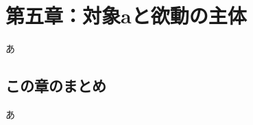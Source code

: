 \section{第五章：対象aと欲動の主体}\label{ux7b2cux4e94ux7ae0ux5bfeux8c61aux3068ux6b32ux52d5ux306eux4e3bux4f53}

あ

\subsection{この章のまとめ}\label{ux3053ux306eux7ae0ux306eux307eux3068ux3081}

あ
